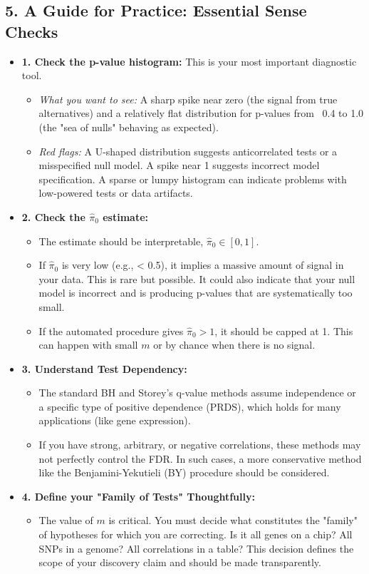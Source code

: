 \documentclass{article}
\newcommand{\hatpiO}{\hat{\pi}_0}
\begin{document}
\subsection*{5. A Guide for Practice: Essential Sense Checks}
\begin{itemize}
    \item \textbf{1. Check the p-value histogram:} This is your most important diagnostic tool.
    \begin{itemize}
        \item \textit{What you want to see:} A sharp spike near zero (the signal from true alternatives) and a relatively flat distribution for p-values from ~0.4 to 1.0 (the "sea of nulls" behaving as expected).
        \item \textit{Red flags:} A U-shaped distribution suggests anticorrelated tests or a misspecified null model. A spike near 1 suggests incorrect model specification. A sparse or lumpy histogram can indicate problems with low-powered tests or data artifacts.
    \end{itemize}
    \item \textbf{2. Check the $\hatpiO$ estimate:}
    \begin{itemize}
        \item The estimate should be interpretable, $\hatpiO \in [0, 1]$.
        \item If $\hatpiO$ is very low (e.g., < 0.5), it implies a massive amount of signal in your data. This is rare but possible. It could also indicate that your null model is incorrect and is producing p-values that are systematically too small.
        \item If the automated procedure gives $\hatpiO > 1$, it should be capped at 1. This can happen with small $m$ or by chance when there is no signal.
    \end{itemize}
    \item \textbf{3. Understand Test Dependency:}
    \begin{itemize}
        \item The standard BH and Storey's q-value methods assume independence or a specific type of positive dependence (PRDS), which holds for many applications (like gene expression).
        \item If you have strong, arbitrary, or negative correlations, these methods may not perfectly control the FDR. In such cases, a more conservative method like the Benjamini-Yekutieli (BY) procedure should be considered.
    \end{itemize}
     \item \textbf{4. Define your "Family of Tests" Thoughtfully:}
    \begin{itemize}
        \item The value of $m$ is critical. You must decide what constitutes the "family" of hypotheses for which you are correcting. Is it all genes on a chip? All SNPs in a genome? All correlations in a table? This decision defines the scope of your discovery claim and should be made transparently.
    \end{itemize}
\end{itemize}
\end{document}
